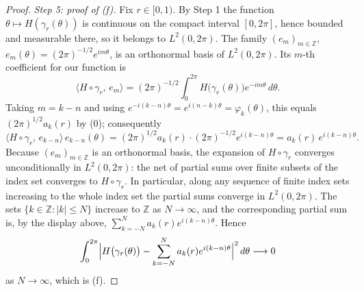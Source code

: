 \begin{proof}
\emph{Step 5: proof of (f).}  Fix $r\in[0,1)$.  By Step 1 the function
$\theta\mapsto H(\gamma_r(\theta))$ is continuous on the compact interval
$[0,2\pi]$, hence bounded and measurable there, so it belongs to
$L^2(0,2\pi)$.  The family $(e_m)_{m\in\mathbb{Z}}$,
$e_m(\theta)=(2\pi)^{-1/2}e^{im\theta}$, is an orthonormal basis of
$L^2(0,2\pi)$.  Its $m$-th coefficient for our function is
\[
  \bigl\langle H\circ\gamma_r,\,e_m\bigr\rangle
  =(2\pi)^{-1/2}\int_0^{2\pi}H\bigl(\gamma_r(\theta)\bigr)e^{-im\theta}\,d\theta .
\]
Taking $m=k-n$ and using $e^{-i(k-n)\theta}=e^{i(n-k)\theta}=\varphi_k(\theta)$,
this equals $(2\pi)^{1/2}a_k(r)$ by (0); consequently
\[
  \bigl\langle H\circ\gamma_r,\,e_{k-n}\bigr\rangle\,e_{k-n}(\theta)
  =(2\pi)^{1/2}a_k(r)\cdot(2\pi)^{-1/2}e^{i(k-n)\theta}
  =a_k(r)\,e^{i(k-n)\theta}.
\]
Because $(e_m)_{m\in\mathbb{Z}}$ is an orthonormal basis, the expansion of
$H\circ\gamma_r$ converges unconditionally in $L^2(0,2\pi)$: the net of partial
sums over finite subsets of the index set converges to $H\circ\gamma_r$.  In
particular, along any sequence of finite index sets increasing to the whole
index set the partial sums converge in $L^2(0,2\pi)$.  The sets
$\{k\in\mathbb{Z}:|k|\le N\}$ increase to $\mathbb{Z}$ as $N\to\infty$, and the
corresponding partial sum is, by the display above,
$\sum_{k=-N}^{N}a_k(r)e^{i(k-n)\theta}$.  Hence
\[
  \int_0^{2\pi}\Bigl|H\bigl(\gamma_r(\theta)\bigr)
    -\sum_{k=-N}^{N}a_k(r)e^{i(k-n)\theta}\Bigr|^2\,d\theta\longrightarrow0
\]
as $N\to\infty$, which is (f).
\end{proof}
